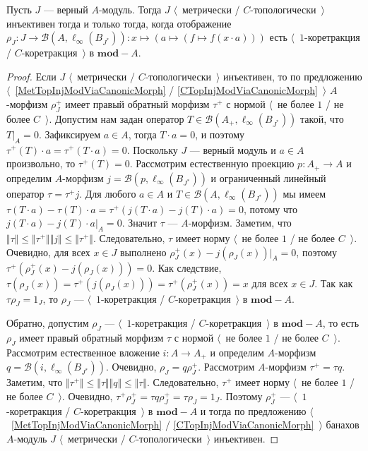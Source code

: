 \begin{proposition}\label{NonDegenMetTopInjCharac}  Пусть $J$ --- верный $A$-модуль. Тогда $J$ $\langle$~метрически / $C$-топологически~$\rangle$ инъективен тогда и только тогда, когда отображение $\rho_J:J\to\mathcal{B}(A,\ell_\infty(B_{J^*})):x\mapsto(a\mapsto(f\mapsto f(x\cdot a)))$ есть $\langle$~$1$-коретракция / $C$-коретракция~$\rangle$ в $\mathbf{mod}-A$.
\end{proposition} 
\begin{proof}
Если $J$ $\langle$~метрически / $C$-топологически~$\rangle$ инъективен, то по предложению $\langle$~\ref{MetTopInjModViaCanonicMorph} / \ref{CTopInjModViaCanonicMorph}~$\rangle$ $A$-морфизм $\rho_J^+$ имеет правый обратный морфизм $\tau^+$ с нормой $\langle$~не более $1$ / не более $C$~$\rangle$. Допустим нам задан оператор $T\in \mathcal{B}(A_+,\ell_\infty(B_{J^*}))$ такой, что $T|_A=0$. Зафиксируем $a\in A$, тогда $T\cdot a=0$, и поэтому $\tau^+(T)\cdot a=\tau^+(T\cdot a)=0$. Поскольку $J$ --- верный модуль и $a\in A$ произвольно, то $\tau^+(T)=0$. Рассмотрим естественную проекцию $p:A_+\to A$ и определим $A$-морфизм $j=\mathcal{B}(p,\ell_\infty(B_{J^*}))$ и ограниченный линейный оператор $\tau=\tau^+ j$. Для любого $a\in A$ и $T\in\mathcal{B}(A,\ell_\infty(B_{J^*}))$ мы имеем $\tau(T\cdot a)-\tau(T)\cdot a=\tau^+(j(T\cdot a)-j(T)\cdot a)=0$, потому что $j(T\cdot a)-j(T)\cdot a|_A=0$. Значит $\tau$ --- $A$-морфизм. Заметим, что $\Vert\tau\Vert\leq\Vert\tau^+\Vert\Vert j\Vert\leq \Vert\tau^+\Vert$. Следовательно, $\tau$ имеет норму $\langle$~не более $1$ / не более $C$~$\rangle$. Очевидно, для всех $x\in J$ выполнено $\rho_J^+(x)-j(\rho_J(x))|_A=0$, поэтому $\tau^+(\rho_J^+(x)-j(\rho_J(x)))=0$. Как следствие, $\tau(\rho_J(x))=\tau^+(j(\rho_J(x)))=\tau^+(\rho_J^+(x))=x$ для всех $x\in J$. Так как $\tau\rho_J=1_J$, то $\rho_J$ --- $\langle$~$1$-коретракция / $C$-коретракция~$\rangle$ в $\mathbf{mod}-A$.

Обратно, допустим $\rho_J$ --- $\langle$~$1$-коретракция / $C$-коретракция~$\rangle$ в $\mathbf{mod}-A$, то есть $\rho_J$ имеет правый обратный морфизм $\tau$ с нормой $\langle$~не более $1$ / не более $C$~$\rangle$. Рассмотрим естественное вложение $i:A\to A_+$ и определим $A$-морфизм $q=\mathcal{B}(i,\ell_\infty(B_{J^*}))$. Очевидно, $\rho_J=q\rho_J^+$. Рассмотрим $A$-морфизм $\tau^+=\tau q$. Заметим, что $\Vert\tau^+\Vert\leq\Vert\tau\Vert\Vert q\Vert\leq \Vert\tau\Vert$. Следовательно, $\tau^+$ имеет норму $\langle$~не более $1$ / не более $C$~$\rangle$. Очевидно, $\tau^+\rho_J^+=\tau q\rho_J^+=\tau\rho_J=1_J$. Поэтому $\rho_J^+$ --- $\langle$~$1$-коретракция / $C$-коретракция~$\rangle$ в $\mathbf{mod}-A$ и тогда по предложению $\langle$~\ref{MetTopInjModViaCanonicMorph} / \ref{CTopInjModViaCanonicMorph}~$\rangle$ банахов $A$-модуль $J$ $\langle$~метрически / $C$-топологически~$\rangle$ инъективен.
\end{proof}

